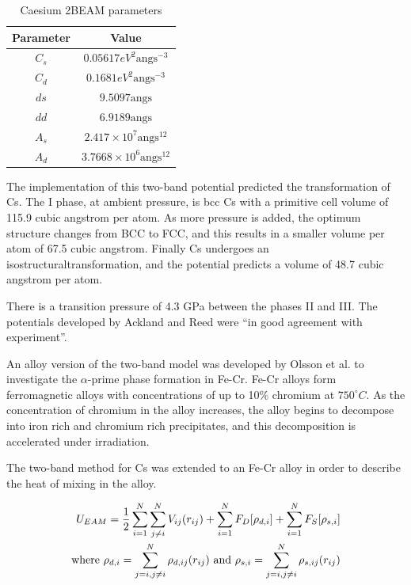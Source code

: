 \begin{table}[h]
\begin{center}
\renewcommand{\arraystretch}{1.2}
\begin{tabular}{c c}
\hline\hline
Parameter & Value \\
\hline\hline
$C_s$ & $0.05617 eV^2 \text{angs}^{-3}$ \\
$C_d$ & $0.1681 eV^2 \text{angs}^{-3}$ \\
$ds$  & $9.5097 \text{angs}$ \\
$dd$  & $6.9189 \text{angs}$ \\
$A_s$ & $2.417 \times 10^7 \text{angs}^{12}$ \\
$A_d$ & $3.7668 \times 10^6 \text{angs}^{12}$ \\
\hline\hline
\end{tabular}
\caption{Caesium 2BEAM parameters}
\label{table:caesiumeamparameters}
\end{center}
\end{table}

The implementation of this two-band potential predicted the transformation of \Gls{Cs}.  The I phase, at ambient pressure, is \acrshort{bcc} \Gls{Cs} with a primitive cell volume of 115.9 cubic angstrom per atom.  As more pressure is added, the optimum structure changes from BCC to FCC, and this results in a smaller volume per atom of 67.5 cubic angstrom.  Finally \Gls{Cs} undergoes an \gls{isostructuraltransformation}, and the potential predicts a volume of 48.7 cubic angstrom per atom.

There is a transition pressure of 4.3 GPa between the phases II and III.  The potentials developed by Ackland and Reed were \enquote{in good agreement with experiment}\cite{twobandackland}.

An alloy version of the two-band model was developed by Olsson et al. to investigate the $\alpha$-prime phase formation in Fe-Cr\cite{olssonfecr}. Fe-Cr alloys form ferromagnetic alloys with concentrations of up to 10\% chromium at $750^{\circ}C$.  As the concentration of chromium in the alloy increases, the alloy begins to decompose into iron rich and chromium rich precipitates, and this decomposition is accelerated under irradiation.

The two-band method for \Gls{Cs} was extended to an Fe-Cr alloy in order to describe the heat of mixing in the alloy.

\begin{equation}
\begin{split}
U_{EAM} = \frac{1}{2} \sum \limits_{i=1}^{N} \sum \limits_{j\ne i}^{N} V_{ij}(r_{ij}) + \sum \limits_{i=1}^{N} F_{D}[\rho _{d,i}] + \sum \limits_{i=1}^{N} F_{S}[\rho _{s,i}] \\
\textnormal{where   } \rho_{d,i} = \sum \limits_{j=i,j \ne i}^{N} \rho_{d,ij}(r_{ij})
\textnormal{  and  } \rho_{s,i} = \sum \limits_{j=i,j \ne i}^{N} \rho_{s,ij}(r_{ij})
\end{split}
\end{equation}

